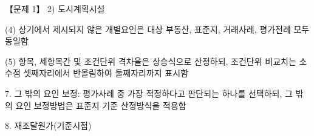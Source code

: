 \begin{longquestion}{【문제 1】}
2) 도시계획시설 \par
{\small\centering\renewcommand{\arraystretch}{1.25}
\par}

\medskip\noindent (4) 상기에서 제시되지 않은 개별요인은 대상 부동산, 표준지, 거래사례, 평가전례 모두 동일함 \par
\medskip\noindent (5) 항목, 세항목간 및 조건단위 격차율은 상승식으로 산정하되, 조건단위 비교치는 소수점 셋째자리에서 반올림하여 둘째자리까지 표시함 \par
7. 그 밖의 요인 보정: 평가사례 중 가장 적정하다고 판단되는 하나를 선택하되, 그 밖의 요인 보정방법은 표준지 기준 산정방식을 적용함 \par
8. 재조달원가(기준시점) \par
{\small\centering\renewcommand{\arraystretch}{1.25}
\par}


\end{longquestion}
